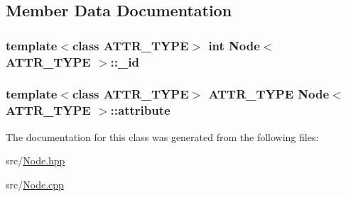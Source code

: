 \subsection{Member Data Documentation}
\hypertarget{class_node_a5e3e6151c01a35fe62ebf9e18e290c81}{
\subsubsection[{\+\_\+id}]{\setlength{\rightskip}{0pt plus 5cm}template$<$class A\+T\+T\+R\+\_\+\+T\+Y\+P\+E$>$ int {\bf Node}$<$ A\+T\+T\+R\+\_\+\+T\+Y\+P\+E $>$\+::\+\_\+id\hspace{0.3cm}{\ttfamily [private]}}}\label{class_node_a5e3e6151c01a35fe62ebf9e18e290c81}
\hypertarget{class_node_adb31592b8453bfb8385a97700249f0f9}{
\subsubsection[{attribute}]{\setlength{\rightskip}{0pt plus 5cm}template$<$class A\+T\+T\+R\+\_\+\+T\+Y\+P\+E$>$ A\+T\+T\+R\+\_\+\+T\+Y\+P\+E {\bf Node}$<$ A\+T\+T\+R\+\_\+\+T\+Y\+P\+E $>$\+::attribute\hspace{0.3cm}{\ttfamily [private]}}}\label{class_node_adb31592b8453bfb8385a97700249f0f9}


The documentation for this class was generated from the following files\+:\begin{DoxyCompactItemize}
\item 
src/\hyperlink{_node_8hpp}{Node.\+hpp}\item 
src/\hyperlink{_node_8cpp}{Node.\+cpp}\end{DoxyCompactItemize}
